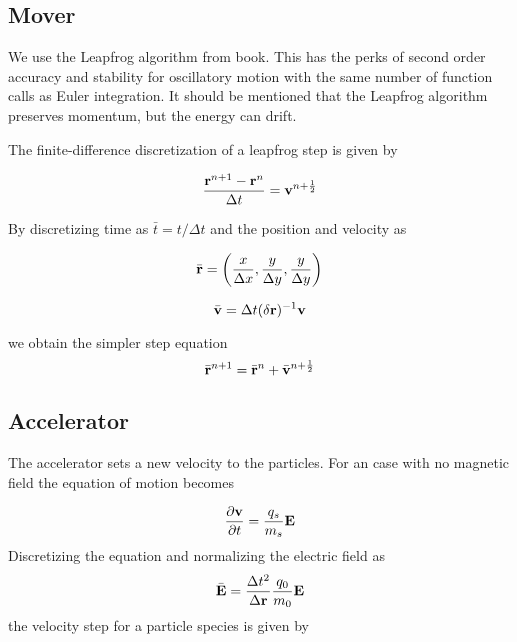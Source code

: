         \subsection{Mover}
            We use the Leapfrog algorithm from \textit{} \citep{birdsall_plasma_2004}
            book. This has the perks of second order accuracy and stability for oscillatory motion
            with the same number of function calls as Euler integration. It should
            be mentioned that the Leapfrog algorithm preserves momentum, but the
            energy can drift.

            \noindent The finite-difference discretization of a leapfrog step is given by

            \begin{equation}
                \frac{\vb{r}^{n+1}-\vb{r}^n}{\Delta t} = \vb{v}^{n+\frac{1}{2}}
            \end{equation}

            \noindent By discretizing time as \(\bar{t}= t/\Delta t\) and the position and velocity as

            \begin{equation}
                    \bar{\vb{r}} = \left( \frac{x}{\Delta x}, \frac{y}{\Delta y}, \frac{y}{\Delta y} \right)
            \end{equation}

            \begin{equation}
                \bar{\vb{v}} = \Delta t (\delta \vb{r})^{-1} \vb{v}
            \end{equation}

            \noindent we obtain the simpler step equation
            \begin{equation}
                \bar{\vb{r}}^{n+1} = \bar{\vb{r}}^{n} + \bar{\vb{v}}^{n+\frac{1}{2}}
            \end{equation}

        \subsection{Accelerator}
            The accelerator sets a new velocity to the particles. For an case with
            no magnetic field the equation of motion becomes

            \begin{equation}
                \pdv{\vb{v}}{t} = \frac{q_s}{m_s} \vb{E}
            \end{equation}
%
            Discretizing the equation and normalizing the electric field as
            \begin{equation}
                \bar{\vb{E}} = \frac{\Delta t^2}{\Delta \vb{r}} \frac{q_0}{m_0}\vb{E}
            \end{equation}
%
            the velocity step for a particle species is given by


